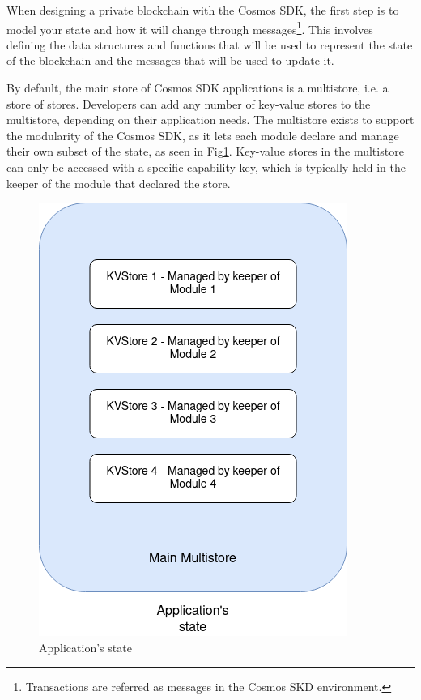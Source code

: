 When designing a private blockchain with the Cosmos SDK, the first step is to model your state and how it will change through messages\footnote{Transactions are referred as messages in the Cosmos SKD environment.}. This involves defining the data structures and functions that will be used to represent the state of the blockchain and the messages that will be used to update it.

By default, the main store of Cosmos SDK applications is a multistore, i.e. a store of stores. Developers can add any number of key-value stores to the multistore, depending on their application needs. The multistore exists to support the modularity of the Cosmos SDK, as it lets each module declare and manage their own subset of the state, as seen in Fig\ref{fig:application-multistore}. Key-value stores in the multistore can only be accessed with a specific capability key, which is typically held in the keeper of the module that declared the store.

\begin{figure}[H]
    \centering
    \includegraphics[scale=0.45]{figures/multistore.png}
    \caption{Application's state}
    \label{fig:application-multistore}
\end{figure}

